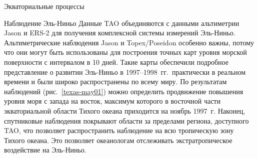 \begin{chapter}{Экваториальные процессы}
\begin{section}{Наблюдение Эль-Ниньо}
Данные TAO объединяются с данными альтиметрии Jason и 
ERS-2 для
получения комплексной системы измерений Эль-Ниньо. Альтиметрические
наблюдения Jason и Topex/Poseidon особенно важны, 
потому что они могут быть использованы для построения точных карт уровня 
морской поверхности с интервалом
в 10 дней. Такие карты обеспечили подробное представление о развитии
Эль-Ниньо в 1997--1998~гг.\ практически в реальном времени и были широко
распространены по всему миру. По результатам наблюдений 
(рис.~\ref{texas-may01}) можно определить продвижение повышения уровня моря 
с запада на восток, максимум которого в восточной части экваториальной 
области Тихого океана приходится на ноябрь 1997~г. Наконец, спутниковые 
наблюдения покрывают области за пределами региона, доступного TAO, что
позволяет распространить наблюдение на всю тропическую зону
Тихого океана. Это позволяет океанологам отслеживать
экстратропическое воздействие на Эль-Ниньо.
%


\end{section}
\end{chapter}
